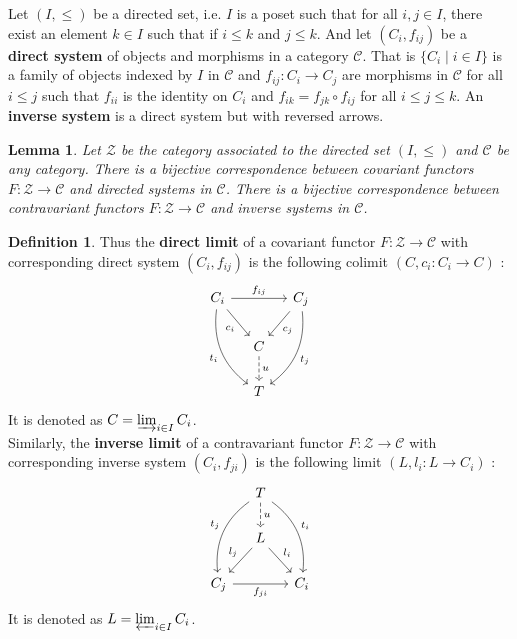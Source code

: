 \documentclass{article}
\theoremstyle{plain}
\newtheorem{lemma}[theorem]{Lemma}
\theoremstyle{definition}
\newtheorem{definition}[theorem]{Definition}
\begin{document}
Let $(I,\leq)$ be a directed set, i.e. $I$ is a poset such that for all $i,j\in I$, there exist an element $k\in I$ such that if $i\leq k$ and $j\leq k$.
And let $(C_i, f_{ij})$ be a \textbf{direct system} of objects and morphisms in a category $\mathcal{C}$.
That is $\{C_i\mid i\in I\}$ is a family of objects indexed by $I$ in $\mathcal{C}$ and $f_{ij}:C_i\rightarrow C_j$ are morphisms in $\mathcal{C}$ for all $i\leq j$ such that $f_{ii}$ is the identity on $C_i$ and $f_{ik} = f_{jk}\circ f_{ij}$ for all $i\leq j \leq k$.
An \textbf{inverse system} is a direct system but with reversed arrows.

\begin{lemma}
\label{lemma_joost_direct_limit}
    Let $\mathcal{Z}$ be the category associated to the directed set $(I,\leq)$ and $\mathcal{C}$ be any category.
    There is a bijective correspondence between covariant functors $F : \mathcal{Z}\rightarrow \mathcal{C}$ and directed systems in $\mathcal{C}$.
    There is a bijective correspondence between contravariant functors $F : \mathcal{Z}\rightarrow \mathcal{C}$ and inverse systems in $\mathcal{C}$.
\end{lemma}

\begin{definition}
\label{def_direct_inverse_limit}
    Thus the \textbf{direct limit} of a covariant functor $F : \mathcal{Z}\rightarrow \mathcal{C}$ with corresponding direct system $(C_i, f_{ij})$ is the following colimit $(C, c_i:C_i\rightarrow C)$ :  
    \[
    \begin{tikzcd}[column sep=small]
        C_i \arrow[rr,"f_{ij}"] \arrow[dr, "c_i"'] \arrow[ddr, bend right, "t_i"'] && C_j \arrow[dl, "c_j"] \arrow[ddl, bend left, "t_j"]\\
        & C \arrow[d, dashed, "u"] &\\
        &  T 
    \end{tikzcd}
    \]
    It is denoted as $C=\varinjlim_{i\in I} C_i$.\\
    Similarly, the \textbf{inverse limit} of a contravariant functor $F : \mathcal{Z}\rightarrow \mathcal{C}$ with corresponding inverse system $(C_i, f_{ji})$ is the following limit $(L, l_i: L\rightarrow C_i)$ :
    \[
    \begin{tikzcd}[column sep=small]
        & T \arrow[d, dashed, "u"] \arrow[ddr, bend left, "t_i"] \arrow[ddl, bend right, "t_j"']&\\
        & L \arrow[dr, "l_i"] \arrow[dl, "l_j"'] &\\
        C_j \arrow[rr,"f_{ji}"']   && C_i 
    \end{tikzcd}
    \]
    It is denoted as $L=\varprojlim_{i\in I} C_i$.
\end{definition}
\end{document}
